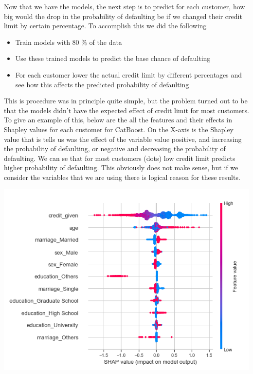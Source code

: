 \documentclass[12pt,a4paper,leqno]{report}
\theoremstyle{plain}
\theoremstyle{definition}
\theoremstyle{remark}
\begin{document}
Now that we have the models, the next step is to predict for each customer, how
big would the drop in the probability of defaulting be if we changed their
credit limit by certain percentage. To accomplish this we did the following

\begin{itemize}
    \item Train models with 80 \% of the data
    \item Use these trained models to predict the base chance of defaulting
    \item For each customer lower the actual credit limit by different percentages
    and see how this affects the predicted probability of defaulting
\end{itemize}

This is procedure was in principle quite simple, but the problem turned out to be that
the models didn't have the expected effect of credit limit for most customers.
To give an example of this, below are the all the features and their effects in
Shapley values for each customer for CatBoost. On the X-axis is the Shapley
value that is tells us was the effect of the variable value positive, and increasing
the probability of defaulting, or negative and decreasing the probability of defaulting.
We can se that for most customers (dots) low credit limit predicts higher probability
of defaulting. This obviously does not make sense, but if we consider the
variables that we are using there is logical reason for these results.

\bigskip
{
    \centering
    \includegraphics[width=\textwidth,height=\textheight,keepaspectratio]{catboost_shap_all_features.png}
    \par
}
\bigskip
\end{document}
